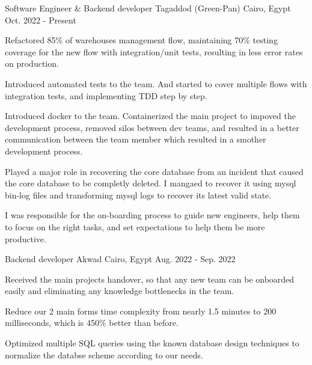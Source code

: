 

\begin{cventries}

  \cventry
    {Software Engineer \& Backend developer} %
    {Tagaddod (Green-Pan)} %
    {Cairo, Egypt} %
    {Oct. 2022 - Present} %
    {
      \begin{cvitems} %
        \item {Refactored 85\% of warehouses management flow, maintaining 70\% testing coverage for the new flow with integration/unit tests, resulting in less error rates on production.}
        \item {Introduced automated tests to the team. And started to cover multiple flows with integration tests, and implementing TDD step by step.}
        \item {Introduced docker to the team. Containerized the main project to impoved the development process, removed silos between dev teams, and resulted in a better communication between the team member which resulted in a smother development process.}
        \item {Played a major role in recovering the core database from an incident that caused the core database to be completly deleted. I mangaed to recover it using mysql bin-log files and transforming mysql logs to recover its latest valid state.
              }
        \item {I was responsible for the on-boarding process to guide new engineers, help them to focus on the right tasks, and set expectations to help them be more productive.}
      \end{cvitems}
    }

  \cventry
    {Backend developer} %
    {Akwad} %
    {Cairo, Egypt} %
    {Aug. 2022 - Sep. 2022} %
    {
      \begin{cvitems} %
        \item {Received the main projects handover, so that any new team can be onboarded easily and eliminating any knowledge bottlenecks in the team.}
        \item {Reduce our 2 main forms time complexity from nearly 1.5 minutes to 200 milliseconds, which is 450\% better than before.}
        \item {Optimized multiple SQL queries using the known database design techniques to normalize the databse scheme according to our needs.}
      \end{cvitems}
    }


\end{cventries}
